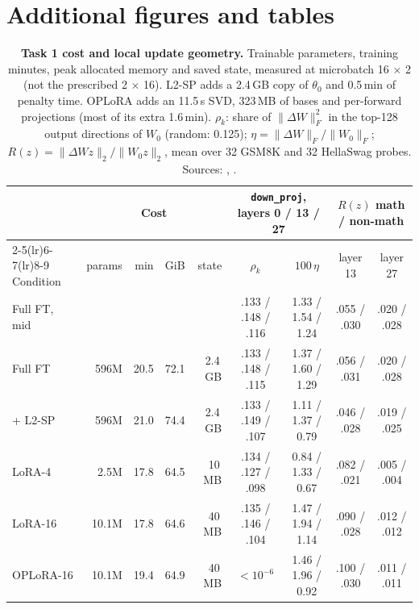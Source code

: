 \clearpage
\appendix
\section{Additional figures and tables}
\label{app:figures}

\begin{table}[H]
  \centering
  \small
  \setlength{\tabcolsep}{2.6pt}
  \begin{tabular}{lrrrrcccc}
    \toprule
    & \multicolumn{4}{c}{Cost} & \multicolumn{2}{c}{\texttt{down\_proj}, layers 0 / 13 / 27} & \multicolumn{2}{c}{$R(z)$ math / non-math} \\
    \cmidrule(lr){2-5}\cmidrule(lr){6-7}\cmidrule(lr){8-9}
    Condition & params & min & GiB & state & $\rho_k$ & $100\,\eta$ & layer 13 & layer 27 \\
    \midrule
    Full FT, mid & & & & & .133 / .148 / .116 & 1.33 / 1.54 / 1.24 & .055 / .030 & .020 / .028 \\
    Full FT & 596M & 20.5 & 72.1 & 2.4\,GB & .133 / .148 / .115 & 1.37 / 1.60 / 1.29 & .056 / .031 & .020 / .028 \\
    + L2-SP & 596M & 21.0 & 74.4 & 2.4\,GB & .133 / .149 / .107 & 1.11 / 1.37 / 0.79 & .046 / .028 & .019 / .025 \\
    LoRA-4 & 2.5M & 17.8 & 64.5 & 10\,MB & .134 / .127 / .098 & 0.84 / 1.33 / 0.67 & .082 / .021 & .005 / .004 \\
    LoRA-16 & 10.1M & 17.8 & 64.6 & 40\,MB & .135 / .146 / .104 & 1.47 / 1.94 / 1.14 & .090 / .028 & .012 / .012 \\
    OPLoRA-16 & 10.1M & 19.4 & 64.9 & 40\,MB & $<10^{-6}$ & 1.46 / 1.96 / 0.92 & .100 / .030 & .011 / .011 \\
    \bottomrule
  \end{tabular}
  \caption{\textbf{Task 1 cost and local update geometry.} Trainable parameters, training minutes, peak allocated memory and saved state, measured at microbatch 16 $\times$ 2 (not the prescribed 2 $\times$ 16). L2-SP adds a 2.4\,GB copy of $\theta_0$ and 0.5\,min of penalty time. OPLoRA adds an 11.5\,s SVD, 323\,MB of bases and per-forward projections (most of its extra 1.6\,min). $\rho_k$: share of $\|\Delta W\|_F^2$ in the top-128 output directions of $W_0$ (random: 0.125); $\eta=\|\Delta W\|_F/\|W_0\|_F$; $R(z)=\|\Delta Wz\|_2/\|W_0z\|_2$, mean over 32 GSM8K and 32 HellaSwag probes. Sources: , .}
  \label{tab:task1diag}
\end{table}



